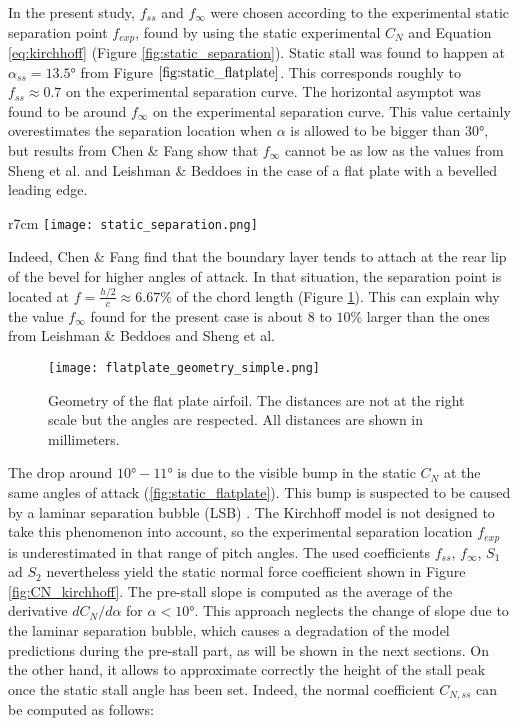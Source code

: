 In the present study, $f_{ss}$ and $f_{\infty}$ were chosen according to the experimental static separation point $f_{exp}$, found by using the static experimental $C_N$ and Equation \eqref{eq:kirchhoff} (Figure \ref{fig:static_separation}). Static stall was found to happen at $\alpha_{ss}=\ang{13.5}$ from Figure $\ref{fig:static_flatplate}$. This corresponds roughly to $f_{ss} \approx 0.7$ on the experimental separation curve. The horizontal asymptot was found to be around $f_\infty$ on the experimental separation curve. This value certainly overestimates the separation location when $\alpha$ is allowed to be bigger than $\ang{30}$, but results from Chen \& Fang show that $f_\infty$ cannot be as low as the values from Sheng et al. and Leishman \& Beddoes in the case of a flat plate with a bevelled leading edge.

\begin{wrapfigure}{r}{7cm}
	\centering
	\texttt{[image: static\_separation.png]}
	\caption{Comparison of the experimental and modelled static separation point}
	\label{fig:static_separation}
\end{wrapfigure}

Indeed, Chen \& Fang find that the boundary layer tends to attach at the rear lip of the bevel for higher angles of attack. 
In that situation, the separation point is located at $f=\frac{h/2}{c}\approx 6.67 \%$ of the chord length (Figure \ref{fig:flatplate_geometry_simple}). This can explain why the value $f_{\infty}$ found for the present case is about $8$ to $10\%$ larger than the ones from Leishman \& Beddoes and Sheng et al.

\begin{figure}[b]
	\centering
	\texttt{[image: flatplate\_geometry\_simple.png]}
	\caption{Geometry of the flat plate airfoil. The distances are not at the right scale but the angles are respected. All distances are shown in millimeters.}
	\label{fig:flatplate_geometry_simple}
\end{figure}

The drop around $\ang{10}-\ang{11}$ is due to the visible bump in the static $C_N$ at the same angles of attack (\ref{fig:static_flatplate}). This bump is suspected to be caused by a laminar separation bubble (LSB) \cite{tank_possibility_2017}. The Kirchhoff model is not designed to take this phenomenon into account, so the experimental separation location $f_{exp}$ is underestimated in that range of pitch angles. The used coefficients $f_{ss}$, $f_\infty$, $S_1$ ad $S_2$ nevertheless yield the static normal force coefficient shown in Figure \ref{fig:CN_kirchhoff}. The pre-stall slope is computed as the average of the derivative $dC_N/d\alpha$ for $\alpha<\ang{10}$. This approach neglects the change of slope due to the laminar separation bubble, which causes a degradation of the model predictions during the pre-stall part, as will be shown in the next sections. On the other hand, it allows to approximate correctly the height of the stall peak once the static stall angle has been set. Indeed, the normal coefficient $C_{N,ss}$ can be computed as follows:

